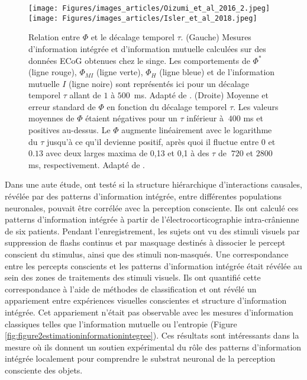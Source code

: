 \begin{figure*}[!t]
\center
\texttt{[image: Figures/images\_articles/Oizumi\_et\_al\_2016\_2.jpeg]}
\texttt{[image: Figures/images\_articles/Isler\_et\_al\_2018.jpeg]}
\caption[Relation entre $\Phi$ et le décalage temporel $\tau$]{Relation entre $\Phi$ et le décalage temporel $\tau$. (Gauche) Mesures d'information intégrée et d'information mutuelle calculées sur des données ECoG obtenues chez le singe. Les comportements de $\Phi^*$ (ligne rouge), $\Phi_{MI}$ (ligne verte), $\Phi_H$ (ligne bleue) et de l'information mutuelle $I$ (ligne noire) sont représentés ici pour un décalage temporel $\tau$ allant de $1$ à $500$~ms. Adapté de \cite{oizumi2016measuring}. (Droite) Moyenne et erreur standard de $\Phi$ en fonction du décalage temporel $\tau$. Les valeurs moyennes de $\Phi$ étaient négatives pour un $\tau$ inférieur à $~400$ ms et positives au-dessus. Le $\Phi$ augmente linéairement avec le logarithme du $\tau$ jusqu'à ce qu'il devienne positif, après quoi il fluctue entre $0$ et $0.13$ avec deux larges maxima de 0,13 et 0,1 à des $\tau$ de $~720$ et $2800$ ms, respectivement. Adapté de \cite{isler2018integrated}.}
\label{fig:figure2informationintegreedecalagetemporel}
\end{figure*}

Dans une aute étude, \cite{haun2017conscious} ont testé si la structure hiérarchique d'interactions causales, révélée par des patterns d'information intégrée, entre différentes populations neuronales, pouvait être corrélée avec la perception consciente. 
Ils ont calculé ces patterns d'information intégrée à partir de l'électrocorticographie intra-crânienne de six patients. 
Pendant l'enregistrement, les sujets ont vu des stimuli visuels par suppression de flashs continus et par masquage destinés à dissocier le percept conscient du stimulus, ainsi que des stimuli non-masqués. 
Une correspondance entre les percepts conscients et les patterns d'information intégrée était révélée au sein des zones de traitements des stimuli visuels. 
Ils ont quantifié cette correspondance à l'aide de méthodes de classification et ont révélé un appariement entre expériences visuelles conscientes et structure d'information intégrée. 
Cet appariement n'était pas observable avec les mesures d'information classiques telles que l'information mutuelle ou l'entropie (Figure \ref{fig:figure2estimationinformationintegree}). 
Ces résultats sont intéressants dans la mesure où ils donnent un soutien expérimental du rôle des patterns d'information intégrée localement pour comprendre le substrat neuronal de la perception consciente des objets. 

